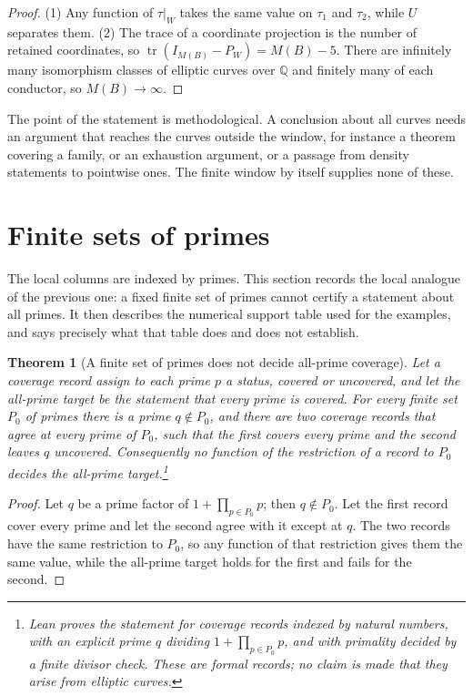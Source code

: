 \documentclass[11pt]{article}
\newtheorem{theorem}{Theorem}[section]
\theoremstyle{definition}
\newcommand{\Q}{\mathbb{Q}}
\newcommand{\tr}{\operatorname{tr}}
\begin{document}
\begin{proof}
(1) Any function of $\tau|_W$ takes the same value on $\tau_1$ and
$\tau_2$, while $U$ separates them.  (2) The trace of a coordinate
projection is the number of retained coordinates, so
$\tr(I_{M(B)}-P_W)=M(B)-5$.  There are infinitely many isomorphism classes
of elliptic curves over $\Q$ and finitely many of each conductor, so
$M(B)\to\infty$.
\end{proof}

The point of the statement is methodological.  A conclusion about all
curves needs an argument that reaches the curves outside the window, for
instance a theorem covering a family, or an exhaustion argument, or a
passage from density statements to pointwise ones.  The finite window by
itself supplies none of these.
 \section{Finite sets of primes}
\label{sec:support-prime-no-go}

The local columns are indexed by primes.  This section records the local
analogue of the previous one: a fixed finite set of primes cannot certify
a statement about all primes.  It then describes the numerical support
table used for the examples, and says precisely what that table does and
does not establish.

\begin{theorem}[A finite set of primes does not decide all-prime coverage]\label{thm:apparatus:finite-prime-cover-no-go}
Let a \emph{coverage record} assign to each prime $p$ a status, covered or
uncovered, and let the all-prime target be the statement that every prime
is covered.  For every finite set $P_0$ of primes there is a prime
$q\notin P_0$, and there are two coverage records that agree at every
prime of $P_0$, such that the first covers every prime and the second
leaves $q$ uncovered.  Consequently no function of the restriction of a
record to $P_0$ decides the all-prime target.\footnote{Lean proves the statement for coverage records indexed by natural
numbers, with an explicit prime $q$ dividing $1+\prod_{p\in P_0}p$, and
with primality decided by a finite divisor check.  These are formal
records; no claim is made that they arise from elliptic curves.}
\end{theorem}

\begin{proof}
Let $q$ be a prime factor of $1+\prod_{p\in P_0}p$; then $q\notin P_0$.
Let the first record cover every prime and let the second agree with it
except at $q$.  The two records have the same restriction to $P_0$, so
any function of that restriction gives them the same value, while the
all-prime target holds for the first and fails for the second.
\end{proof}
\end{document}
